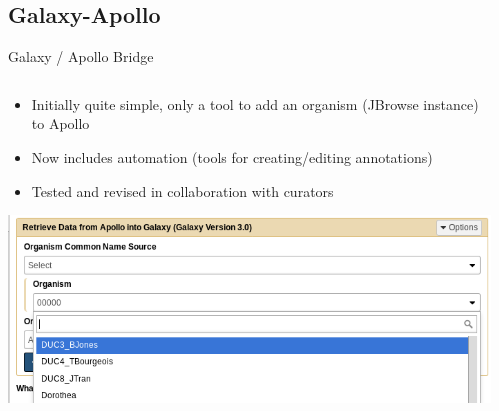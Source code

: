 \documentclass[12pt]{phage3slides} %
\begin{document}
\subsection{Galaxy-Apollo}
\begin{frame}{Galaxy / Apollo Bridge}
    \begin{columns}
        \begin{column}{0.58\textwidth}
            \begin{itemize}
                \item Initially quite simple, only a tool to add an organism (JBrowse instance) to Apollo
                \item Now includes automation (tools for creating/editing annotations)
                \item Tested and revised in collaboration with curators
            \end{itemize}
            \includegraphics[width=\textwidth]{img/select}
        \end{column}
        \begin{column}{0.38\textwidth}

\end{column}
\end{columns}
\end{frame}
\end{document}
